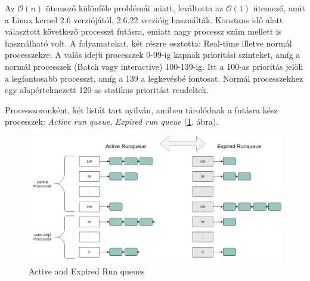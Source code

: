 
Az $\mathcal{O}(n)$ ütemező különféle problémái miatt, leváltotta az $\mathcal{O}(1)$ ütemező, amit a Linux kernel 2.6 verziójától, 2.6.22 verzióig használták. 
Konstans idő alatt választott következő processzt futásra, emiatt nagy processz szám mellett is használható volt.
A folyamatokat, két részre osztotta: Real-time illetve normál processzekre. A valós idejű processzek 0-99-ig kapnak prioritási szinteket, amíg a normál processzek (Batch vagy interactive) 100-139-ig. Itt a 100-as prioritás jelöli a legfontosabb processzt, amíg a 139 a legkevésbé fontosat. Normál processzekhez egy alapértelmezett 120-as statikus prioritást rendeltek. 

Processzoronként, két listát tart nyilván, amiben tárolódnak a futásra kész processzek: \textit{Active run queue}, \textit{Expired run queue} (\ref{fig:activeExpiredRunqueue}. ábra).

\begin{figure}[h]
\centering
\includegraphics[width=\textwidth]{images/activeExpiredRunqueue.png}
\caption{Active and Expired Run queues}
\label{fig:activeExpiredRunqueue}
\end{figure}


